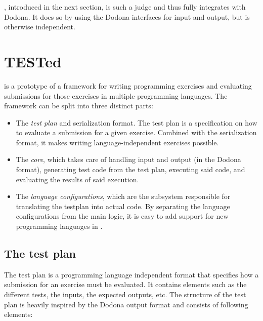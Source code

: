 \documentclass[5p,number]{elsarticle}
\begin{document}
    \tested{}, introduced in the next section, is such a judge and thus fully integrates with Dodona.
    It does so by using the Dodona interfaces for input and output, but is otherwise independent.

    \section{TESTed}\label{sec:extended-test}

    \tested{} is a prototype of a framework for writing programming exercises and evaluating submissions for those exercises in multiple programming languages.
    The framework can be split into three distinct parts:

    \begin{itemize}
        \item The \emph{test plan} and serialization format.
        The test plan is a specification on how to evaluate a submission for a given exercise.
        Combined with the serialization format, it makes writing language-independent exercises possible.
        \item The \emph{core}, which takes care of handling input and output (in the Dodona format), generating test code from the test plan, executing said code, and evaluating the results of said execution.
        \item The \emph{language configurations}, which are the subsystem responsible for translating the testplan into actual code.
        By separating the language configurations from the main logic, it is easy to add support for new programming languages in \tested{}.
    \end{itemize}

    \subsection{The test plan}\label{subsec:the-test-plan}

    The test plan is a programming language independent format that specifies how a submission for an exercise must be evaluated.
    It contains elements such as the different tests, the inputs, the expected outputs, etc.
    The structure of the test plan is heavily inspired by the Dodona output format and consists of following elements:
\end{document}
